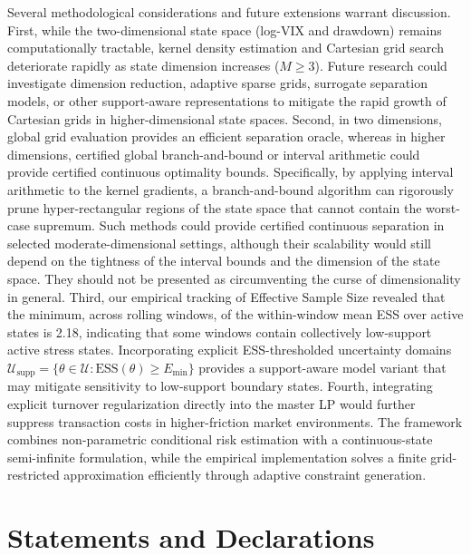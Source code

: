 \documentclass[smallextended]{svjour3}
\begin{document}
Several methodological considerations and future extensions warrant discussion. First, while the two-dimensional state space (log-VIX and drawdown) remains computationally tractable, kernel density estimation and Cartesian grid search deteriorate rapidly as state dimension increases ($M \ge 3$). Future research could investigate dimension reduction, adaptive sparse
grids, surrogate separation models, or other support-aware representations
to mitigate the rapid growth of Cartesian grids in higher-dimensional
state spaces. Second, in two dimensions, global grid evaluation provides an efficient separation oracle, whereas in higher dimensions, certified global branch-and-bound or interval arithmetic could provide certified continuous optimality bounds. Specifically, by applying interval arithmetic to the kernel gradients, a branch-and-bound algorithm can rigorously prune hyper-rectangular regions of the state space that cannot contain the worst-case supremum. Such methods could provide certified continuous separation in selected
moderate-dimensional settings, although their scalability would still
depend on the tightness of the interval bounds and the dimension of the
state space. They should not be presented as circumventing the curse of
dimensionality in general. Third, our empirical tracking of Effective Sample Size revealed that the minimum, across rolling windows, of the within-window mean ESS over active states is 2.18, indicating that some windows contain collectively low-support active stress states. Incorporating explicit ESS-thresholded uncertainty domains $\mathcal{U}_{\text{supp}} = \{\theta \in \mathcal{U} : \text{ESS}(\theta) \ge E_{\min}\}$ provides a support-aware model variant that may mitigate sensitivity to low-support boundary states. Fourth, integrating explicit turnover regularization directly into the master LP would further suppress transaction costs in higher-friction market environments. The framework combines non-parametric conditional risk estimation with a continuous-state semi-infinite formulation, while the empirical implementation solves a finite grid-restricted approximation efficiently through adaptive constraint generation.

\newpage

\appendix


\section*{Statements and Declarations}
\end{document}
